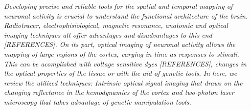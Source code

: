 \label{cap:chapter}

\textit{Developing precise and reliable tools for the spatial and temporal mapping of neuronal activity is crucial to understand the functional architecture of the brain. Radiotracer, electrophisiological, magnetic resonance, anatomic and optical imaging techniques all offer advantages and disadvantages to this end [REFERENCES]. On its part, optical imaging of neuronal activity allows the mapping of large regions of the cortex, varying in time as responses to stimuli. This can be acomplished with voltage sensitive dyes [REFERENCES], changes in the optical properties of the tissue or with the aid of genetic tools. In here, we review the utilized techniques: Intrinsic optical signal imaging that draws on the changing reflectance in the hemodynamics of the cortex and two-photon laser microscopy that takes advantage of genetic manipulation tools.}





\cleardoublepage
